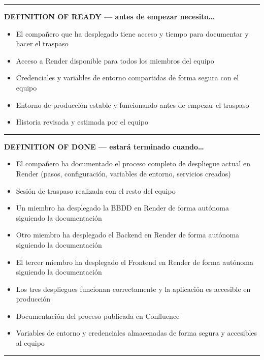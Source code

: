 \documentclass[
  spanish,
  11pt,
]{report}
\providecommand{\tightlist}{%
  \setlength{\itemsep}{0pt}\setlength{\parskip}{0pt}}
\begin{document}
\begin{center}\rule{0.5\linewidth}{0.5pt}\end{center}

\textbf{DEFINITION OF READY --- antes de empezar necesito\ldots{}}

\begin{itemize}
\tightlist
\item
  El compañero que ha desplegado tiene acceso y tiempo para documentar y
  hacer el traspaso
\item
  Acceso a Render disponible para todos los miembros del equipo
\item
  Credenciales y variables de entorno compartidas de forma segura con el
  equipo
\item
  Entorno de producción estable y funcionando antes de empezar el
  traspaso
\item
  Historia revisada y estimada por el equipo
\end{itemize}

\begin{center}\rule{0.5\linewidth}{0.5pt}\end{center}

\textbf{DEFINITION OF DONE --- estará terminado cuando\ldots{}}

\begin{itemize}
\tightlist
\item
  El compañero ha documentado el proceso completo de despliegue actual
  en Render (pasos, configuración, variables de entorno, servicios
  creados)
\item
  Sesión de traspaso realizada con el resto del equipo
\item
  Un miembro ha desplegado la BBDD en Render de forma autónoma siguiendo
  la documentación
\item
  Otro miembro ha desplegado el Backend en Render de forma autónoma
  siguiendo la documentación
\item
  El tercer miembro ha desplegado el Frontend en Render de forma
  autónoma siguiendo la documentación
\item
  Los tres despliegues funcionan correctamente y la aplicación es
  accesible en producción
\item
  Documentación del proceso publicada en Confluence
\item
  Variables de entorno y credenciales almacenadas de forma segura y
  accesibles al equipo
\end{itemize}

\begin{center}\rule{0.5\linewidth}{0.5pt}\end{center}
\end{document}
